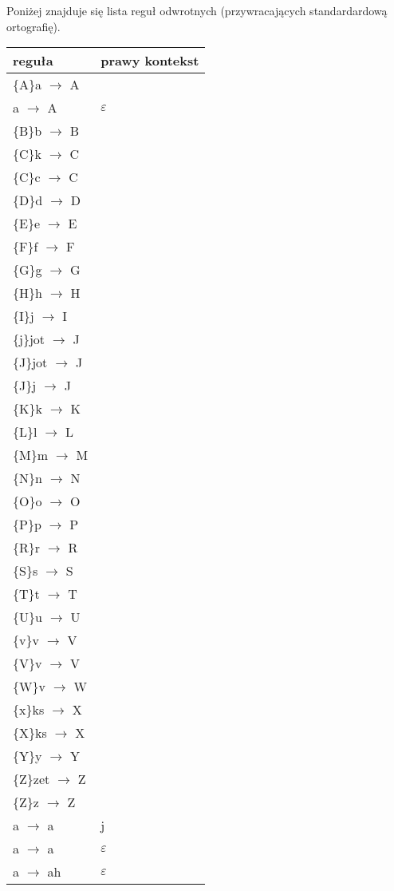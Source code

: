 \documentclass{article}
\begin{document}
Poniżej znajduje się lista reguł odwrotnych (przywracających standardardową ortografię).
\begin{longtable}{l|p{10cm}}
reguła & prawy kontekst \\
\hline
\{A\}a $\rightarrow$ A & \\
a $\rightarrow$ A & $\varepsilon$\\
\{B\}b $\rightarrow$ B & \\
\{C\}k $\rightarrow$ C & \\
\{C\}c $\rightarrow$ C & \\
\{D\}d $\rightarrow$ D & \\
\{E\}e $\rightarrow$ E & \\
\{F\}f $\rightarrow$ F & \\
\{G\}g $\rightarrow$ G & \\
\{H\}h $\rightarrow$ H & \\
\{I\}j $\rightarrow$ I & \\
\{j\}jot $\rightarrow$ J & \\
\{J\}jot $\rightarrow$ J & \\
\{J\}j $\rightarrow$ J & \\
\{K\}k $\rightarrow$ K & \\
\{L\}l $\rightarrow$ L & \\
\{M\}m $\rightarrow$ M & \\
\{N\}n $\rightarrow$ N & \\
\{O\}o $\rightarrow$ O & \\
\{P\}p $\rightarrow$ P & \\
\{R\}r $\rightarrow$ R & \\
\{S\}s $\rightarrow$ S & \\
\{T\}t $\rightarrow$ T & \\
\{U\}u $\rightarrow$ U & \\
\{v\}v $\rightarrow$ V & \\
\{V\}v $\rightarrow$ V & \\
\{W\}v $\rightarrow$ W & \\
\{x\}ks $\rightarrow$ X & \\
\{X\}ks $\rightarrow$ X & \\
\{Y\}y $\rightarrow$ Y & \\
\{Z\}zet $\rightarrow$ Z & \\
\{Z\}z $\rightarrow$ Z & \\
a $\rightarrow$ a & j\\
a $\rightarrow$ a & $\varepsilon$\\
a $\rightarrow$ ah & $\varepsilon$\\

\end{longtable}
\end{document}
